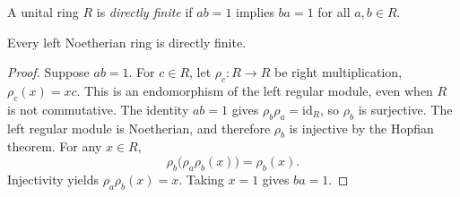 \begin{definition}\label{def-directly-finite-ring}
A unital ring $R$ is \emph{directly finite} if $ab=1$ implies $ba=1$ for all $a,b\in R$.
\end{definition}

\begin{corollary}\label{cor-left-noetherian-directly-finite}
Every left Noetherian ring is directly finite.
\end{corollary}
\begin{proof}\label{proof-left-noetherian-directly-finite}
Suppose $ab=1$. For $c\in R$, let $\rho_c:R\to R$ be right multiplication, $\rho_c(x)=xc$. This is an endomorphism of the left regular module, even when $R$ is not commutative. The identity $ab=1$ gives $\rho_b\rho_a=\mathrm{id}_R$, so $\rho_b$ is surjective. The left regular module is Noetherian, and therefore $\rho_b$ is injective by the Hopfian theorem. For any $x\in R$,
\[
\rho_b\bigl(\rho_a\rho_b(x)\bigr)=\rho_b(x).
\]
Injectivity yields $\rho_a\rho_b(x)=x$. Taking $x=1$ gives $ba=1$.
\end{proof}
